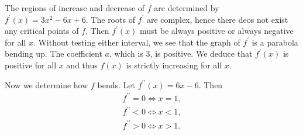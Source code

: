The regions of increase and decrease of $f$ are determined by $f^\prime(x) = 3x^2 - 6x + 6$. The roots of $f^\prime$ are complex, hence there deos not exist any critical points of $f$. Then $f^\prime(x)$ must be always positive or always negative for all $x$. Without testing either interval, we see that the graph of $f^\prime$ is a parabola bending up. The coefficient $a$, which is $3$, is positive. We deduce that $f^\prime(x)$ is positive for all $x$ and thus $f(x)$ is strictly increasing for all $x$.

Now we determine how $f$ bends. Let $f^{\prime\prime}(x) = 6x - 6$. Then
\begin{align}
f^{\prime\prime} = 0 \Leftrightarrow x = 1,\\
f^{\prime\prime} < 0 \Leftrightarrow x < 1,\\
f^{\prime\prime} > 0 \Leftrightarrow x > 1.
\end{align}

